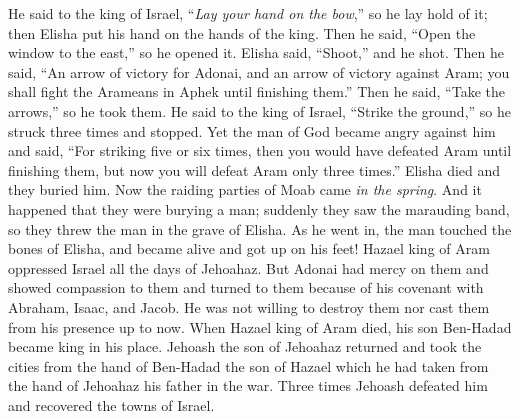 \begin{biblechapter}
\verse He said to the king of Israel, “\textit{Lay your hand on the bow},” so he lay hold of it; then Elisha put his hand on the hands of the king.
\verse Then he said, “Open the window to the east,” so he opened it. Elisha said, “Shoot,” and he shot. Then he said, “An arrow of victory for Adonai, and an arrow of victory against Aram; you shall fight the Arameans in Aphek until finishing them.”
\verse Then he said, “Take the arrows,” so he took them. He said to the king of Israel, “Strike the ground,” so he struck three times and stopped.
\verse Yet the man of God became angry against him and said, “For striking five or six times, then you would have defeated Aram until finishing them, but now you will defeat Aram only three times.”
\verse Elisha died and they buried him. Now the raiding parties of Moab came \textit{in the spring}.
\verse And it happened that they were burying a man; suddenly they saw the marauding band, so they threw the man in the grave of Elisha. As he went in, the man touched the bones of Elisha, and became alive and got up on his feet!
\verse Hazael king of Aram oppressed Israel all the days of Jehoahaz.
\verse But Adonai had mercy on them and showed compassion to them and turned to them because of his covenant with Abraham, Isaac, and Jacob. He was not willing to destroy them nor cast them from his presence up to now.
\verse When Hazael king of Aram died, his son Ben-Hadad became king in his place.
\verse Jehoash the son of Jehoahaz returned and took the cities from the hand of Ben-Hadad the son of Hazael which he had taken from the hand of Jehoahaz his father in the war. Three times Jehoash defeated him and recovered the towns of Israel.
\end{biblechapter}

